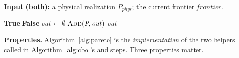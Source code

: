 \documentclass[sigconf,nonacm,review]{acmart}
\theoremstyle{plain}
\theoremstyle{definition}
\theoremstyle{remark}
\begin{document}
\begin{algorithm}[t]
\caption{Pareto-dominance helpers used by Algorithm~\ref{alg:cbo}.}\label{alg:pareto}
\textbf{Input (both):} a physical realization
$P_{\mathit{phys}}$; the current frontier
$\mathit{frontier}$.
\begin{algorithmic}[1]
        \State \Return \textbf{True}
      \EndIf
    \EndFor
    \State \Return \textbf{False}
  \EndFunction
    \State $\mathit{out} \gets \emptyset$
        \State $\Call{Add}{P, \mathit{out}}$
      \EndIf
    \EndFor
    \State \Return $\mathit{out}$
  \EndFunction
\end{algorithmic}
\end{algorithm}

\noindent\textbf{Properties.}
Algorithm~\ref{alg:pareto} is the
\emph{implementation} of the two helpers called in
Algorithm~\ref{alg:cbo}'s
 and  steps.
Three properties matter.
\end{document}
